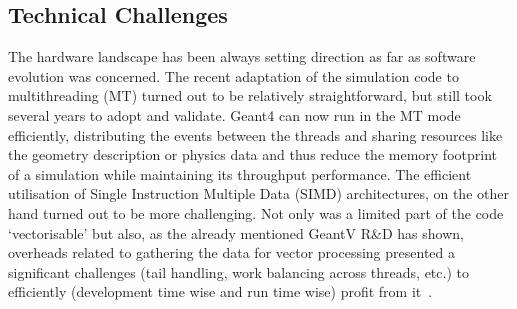 \documentclass[11pt,a4paper]{article}
\begin{document}
\hypertarget{technical-challenges-software-and-computing-1}{%
\subsection{Technical Challenges}\label{technical-challenges-software-and-computing-1}}

The hardware landscape has been always setting direction as far as
software evolution was concerned. The recent adaptation of the
simulation code to multithreading (MT) turned out to be relatively
straightforward, but still took several years to adopt and validate.
Geant4 can now run in the MT mode efficiently, distributing the events
between the threads and sharing resources like the geometry description
or physics data and thus reduce the memory footprint of a simulation
while maintaining its throughput performance. The efficient utilisation
of Single Instruction Multiple Data (SIMD) architectures, on the other
hand turned out to be more challenging. Not only was a limited part of
the code `vectorisable' but also, as the already mentioned GeantV R\&D
has shown, overheads related to gathering the data for vector processing
presented a significant challenges (tail handling, work balancing across
threads, etc.) to efficiently (development time wise and run time wise)
profit from it~\cite{GeantV}.
\end{document}
